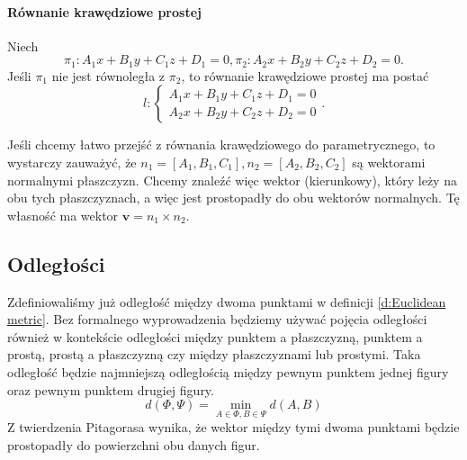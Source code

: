 \paragraph{Równanie krawędziowe prostej} Niech
\[ \pi_1 : A_1x + B_1y + C_1z + D_1 = 0, \pi_2 : A_2x + B_2y + C_2z + D_2 = 0. \]
Jeśli $\pi_1$ nie jest równoległa z $\pi_2$, to równanie krawędziowe prostej ma postać
\begin{equation}
    l : \begin{cases}
        A_1x + B_1y + C_1z + D_1 = 0 \\
        A_2x + B_2y + C_2z + D_2 = 0
    \end{cases}.
\end{equation}

\begin{remark*}
    Jeśli chcemy łatwo przejść z równania krawędziowego do parametrycznego, to wystarczy zauważyć, że $n_1 = [A_1, B_1, C_1], n_2 = [A_2, B_2, C_2]$ są wektorami normalnymi płaszczyzn. Chcemy znaleźć więc wektor (kierunkowy), który leży na obu tych płaszczyznach, a więc jest prostopadły do obu wektorów normalnych. Tę własność ma wektor $\mathbf{v} = n_1 \times n_2$.
\end{remark*}

\subsection{Odległości}
Zdefiniowaliśmy już odległość między dwoma punktami w definicji \ref{d:Euclidean metric}. Bez formalnego wyprowadzenia będziemy używać pojęcia odległości również w kontekście odległości między punktem a płaszczyzną, punktem a prostą, prostą a płaszczyzną czy między płaszczyznami lub prostymi. Taka odległość będzie najmniejszą odległością między pewnym punktem jednej figury oraz pewnym punktem drugiej figury.
\[ d(\Phi, \Psi) = \min_{A \in \Phi, B \in \Psi} d(A, B) \]
Z twierdzenia Pitagorasa wynika, że wektor między tymi dwoma punktami będzie prostopadły do powierzchni obu danych figur.

